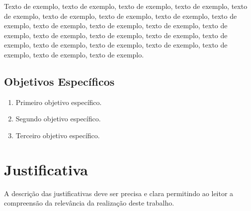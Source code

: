 Texto de exemplo, texto de exemplo, texto de exemplo, texto de exemplo, texto de exemplo, texto de exemplo, texto de exemplo, texto de exemplo, texto de exemplo, texto de exemplo, texto de exemplo, texto de exemplo, texto de exemplo, texto de exemplo, texto de exemplo, texto de exemplo, texto de exemplo, texto de exemplo, texto de exemplo, texto de exemplo, texto de exemplo, texto de exemplo, texto de exemplo.

\subsection{Objetivos Específicos}

\begin{enumerate}
	\item Primeiro objetivo específico.
	\item Segundo objetivo específico.
	\item Terceiro objetivo específico.
\end{enumerate}



\section{Justificativa}\label{cap12}

A descrição das justificativas deve ser precisa e clara permitindo ao leitor a compreensão da relevância da realização deste trabalho.

